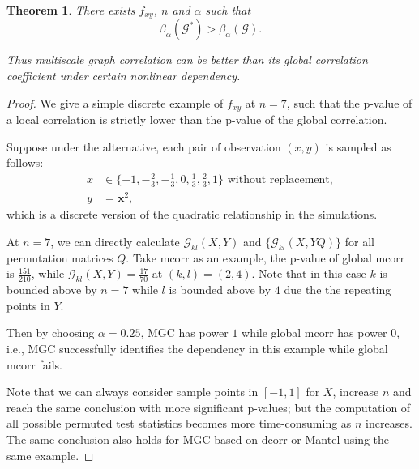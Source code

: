 \documentclass[11pt]{article}
\providecommand{\mb}[1]{\boldsymbol{#1}}
\newcommand{\G}{\mathcal{G}}
\newtheorem{appThm}{Theorem}
\begin{document}
\begin{appThm}
There exists $f_{xy}$, $n$ and $\alpha$ such that 
\begin{equation}
\beta_{\alpha}(\G^{*}) > \beta_{\alpha}(\G).
\end{equation}

Thus multiscale graph correlation can be better than its global correlation coefficient under certain nonlinear dependency.
\end{appThm}
\begin{proof}
We give a simple discrete example of $f_{xy}$ at $n=7$, such that the p-value of a local correlation is strictly lower than the p-value of the global correlation. %

Suppose under the alternative, each pair of observation $(x,y)$ is sampled as follows:
\begin{align*} 
x &\in \{-1,-\frac{2}{3},-\frac{1}{3},0,\frac{1}{3},\frac{2}{3},1\} \mbox{ without replacement}, \\
y &= \mb{x}^2,
\end{align*}
which is a discrete version of the quadratic relationship in the simulations.

At $n=7$, we can directly calculate $\G_{kl}(X, Y)$ and $\{\G_{kl}(X, YQ)\}$ for all permutation matrices $Q$. Take mcorr as an example, the p-value of global mcorr is $\frac{151}{210}$, while $\G_{kl}(X, Y)=\frac{17}{70}$ at $(k,l)=(2,4)$. Note that in this case $k$ is bounded above by $n=7$ while $l$ is bounded above by $4$ due the the repeating points in $Y$. 

Then by choosing $\alpha=0.25$, MGC has power $1$ while global mcorr has power $0$, i.e., MGC successfully identifies the dependency in this example while global mcorr fails. 

Note that we can always consider sample points in $[-1,1]$ for $X$, increase $n$ and reach the same conclusion with more significant p-values; but the computation of all possible permuted test statistics becomes more time-consuming as $n$ increases. The same conclusion also holds for MGC based on dcorr or Mantel using the same example.
\end{proof}



\end{document}
